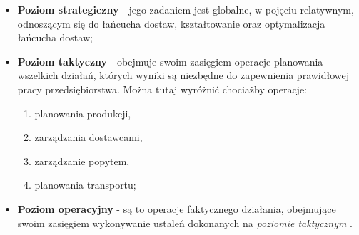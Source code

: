 		\begin{itemize}
			\item \textbf{Poziom strategiczny} 	- jego zadaniem jest globalne,
			w pojęciu relatywnym, odnoszącym się do łańcucha dostaw, kształtowanie oraz optymalizacja
			łańcucha dostaw;
			\item \textbf{Poziom taktyczny}		- obejmuje swoim zasięgiem operacje planowania wszelkich działań, 
			których	wyniki są niezbędne do zapewnienia prawidłowej pracy przedsiębiorstwa. Można tutaj wyróżnić 
			chociażby operacje:
			\begin{enumerate}
				\item planowania produkcji,
				\item zarządzania dostawcami,
				\item zarządzanie popytem,
				\item planowania transportu;
			\end{enumerate}
			\item \textbf{Poziom operacyjny} 	- są to operacje faktycznego działania, obejmujące swoim zasięgiem
			wykonywanie ustaleń dokonanych na \emph{poziomie taktycznym} \cite{ewolucja_lancuchow_dostaw_cz1}.
		\end{itemize}